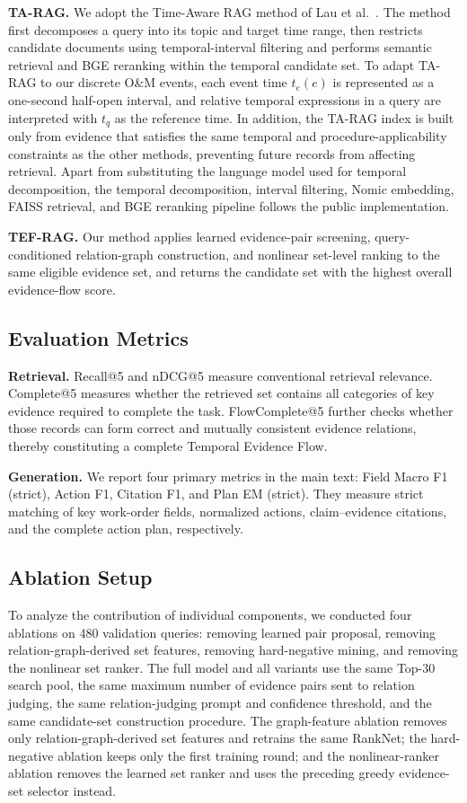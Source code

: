 \textbf{TA-RAG.}
We adopt the Time-Aware RAG method of Lau et al.~\cite{lau2025tarag}. The method first decomposes a query into its topic and target time range, then restricts candidate documents using temporal-interval filtering and performs semantic retrieval and BGE reranking within the temporal candidate set. To adapt TA-RAG to our discrete O\&M events, each event time $t_e(e)$ is represented as a one-second half-open interval, and relative temporal expressions in a query are interpreted with $t_q$ as the reference time. In addition, the TA-RAG index is built only from evidence that satisfies the same temporal and procedure-applicability constraints as the other methods, preventing future records from affecting retrieval. 
Apart from substituting the language model used for temporal decomposition, the temporal decomposition, interval filtering, Nomic embedding, FAISS retrieval, and BGE reranking pipeline follows the public implementation.

\textbf{TEF-RAG.}
Our method applies learned evidence-pair screening, query-conditioned relation-graph construction, and nonlinear set-level ranking to the same eligible evidence set, and returns the candidate set with the highest overall evidence-flow score.

\subsection{Evaluation Metrics}
\label{sec:metrics}

\textbf{Retrieval.}
Recall@5 and nDCG@5 measure conventional retrieval relevance. Complete@5 measures whether the retrieved set contains all categories of key evidence required to complete the task. FlowComplete@5 further checks whether those records can form correct and mutually consistent evidence relations, thereby constituting a complete Temporal Evidence Flow.

\textbf{Generation.}
We report four primary metrics in the main text: Field Macro F1 (strict), Action F1, Citation F1, and Plan EM (strict). They measure strict matching of key work-order fields, normalized actions, claim--evidence citations, and the complete action plan, respectively.

\subsection{Ablation Setup}

To analyze the contribution of individual components, we conducted four ablations on 480 validation queries: removing learned pair proposal, removing relation-graph-derived set features, removing hard-negative mining, and removing the nonlinear set ranker. The full model and all variants use the same Top-30 search pool, the same maximum number of evidence pairs sent to relation judging, the same relation-judging prompt and confidence threshold, and the same candidate-set construction procedure. The graph-feature ablation removes only relation-graph-derived set features and retrains the same RankNet; the hard-negative ablation keeps only the first training round; and the nonlinear-ranker ablation removes the learned set ranker and uses the preceding greedy evidence-set selector instead. 
